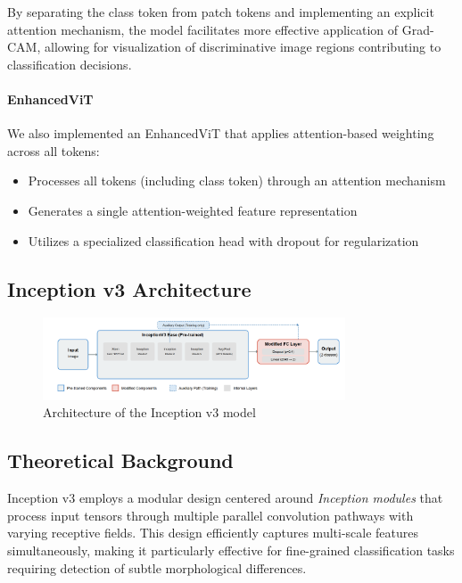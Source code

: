 \documentclass[a4paper,12pt]{report}
\begin{document}
By separating the class token from patch tokens and implementing an explicit attention mechanism, the model facilitates more effective application of Grad-CAM, allowing for visualization of discriminative image regions contributing to classification decisions.


\paragraph{EnhancedViT}
We also implemented an EnhancedViT that applies attention-based weighting across all tokens:

\begin{itemize}
    \item Processes all tokens (including class token) through an attention mechanism
    \item Generates a single attention-weighted feature representation
    \item Utilizes a specialized classification head with dropout for regularization
\end{itemize}


\subsection{Inception v3 Architecture}

\begin{figure}[H]
    \centering
    \includegraphics[width=0.8\textwidth]{images/architecture/inception.png}
    \caption{Architecture of the Inception v3 model}
    \label{fig:inception_architecture}
\end{figure}

\subsection*{Theoretical Background}

Inception v3 \citep{szegedy2015rethinkinginceptionarchitecturecomputer} employs a modular design centered around \textit{Inception modules} that process input tensors through multiple parallel convolution pathways with varying receptive fields. This design efficiently captures multi-scale features simultaneously, making it particularly effective for fine-grained classification tasks requiring detection of subtle morphological differences.
\end{document}
